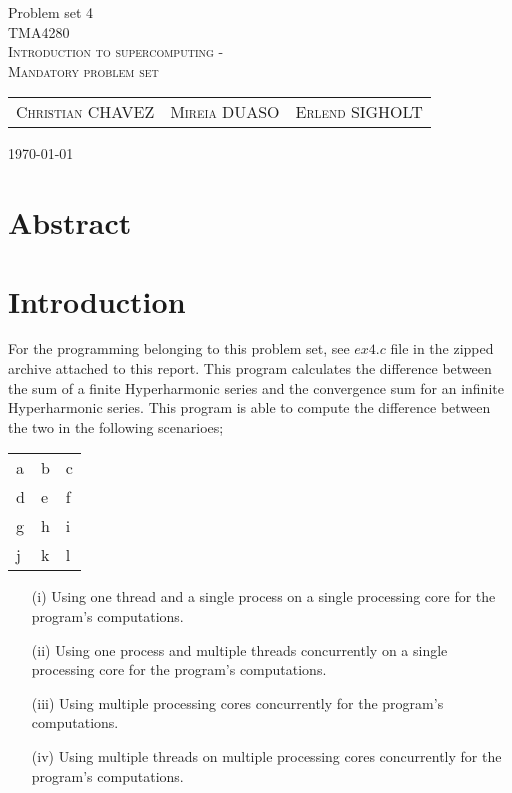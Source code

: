 \documentclass[fontsize=11pt,paper=a4,titlepage]{report}
\begin{document}
\begin{center}


{\huge Problem set 4}\\[0.5cm]

\textsc{\LARGE TMA4280}\\[0.5cm]
\textsc{\large Introduction to supercomputing -}\\%
\textsc{\large Mandatory problem set}\\[0.6cm]


\begin{table}[h]
\centering
\begin{tabular}{ccc}
	\textsc{Christian CHAVEZ}	&	\textsc{Mireia DUASO}	&	\textsc{Erlend SIGHOLT}
\end{tabular}
\end{table}

\large{\today}
\vfill
\section*{Abstract}

\end{center}

\addtocounter{chapter}{1}

\clearpage
\section{Introduction}

For the programming belonging to this problem set, see $\textit{ex4.c}$ file in
the zipped archive attached to this report. This program calculates the
difference between the sum of a finite Hyperharmonic series and the convergence
sum for an infinite Hyperharmonic series. This program is able to compute the
difference between the two in the following scenarioes;

\begin{table}[h]
	\begin{tabular}{lll}
	a & b &c  \\
	d & e & f \\
	g & h & i \\
	j & k & l \\
	\end{tabular}
\end{table}

\begin{enumerate}
	\item[(i)]{Using one thread and a single process on a single processing core
for the program's computations.}
	\item[(ii)]{Using one process and multiple threads concurrently on a single
processing core for the program's computations.}
	\item[(iii)]{Using multiple processing cores concurrently for the program's
computations.}
	\item[(iv)]{Using multiple threads on multiple processing cores concurrently for
the program's computations.}
\end{enumerate}
\end{document}
